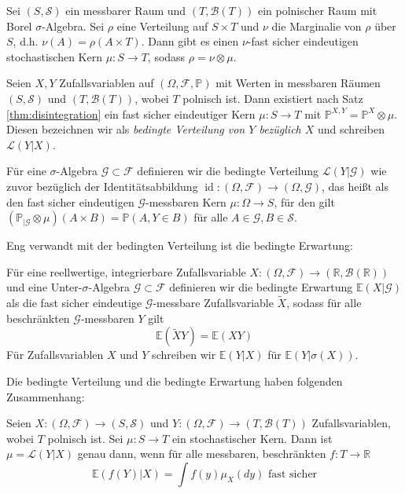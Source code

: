 \begin{theorem}\label{thm:disintegration}
Sei $(S, \mathcal{S})$ ein messbarer Raum und $(T,\mathcal{B}(T))$ ein polnischer Raum mit Borel $\sigma$-Algebra. Sei $\rho$ eine Verteilung auf $S\times T$ und $\nu$ die Marginalie von $\rho$ über $S$, d.h. $\nu(A) = \rho(A\times T)$. Dann gibt es einen $\nu$-fast sicher eindeutigen stochastischen Kern $\mu:S\rightarrow T$, sodass $\rho = \nu \otimes \mu$.
\end{theorem}
\begin{definition}
Seien $X, Y$ Zufallsvariablen auf $(\Omega, \mathcal{F}, \mathbb{P})$ mit Werten in messbaren Räumen $(S, \mathcal{S})$ und $(T, \mathcal{B}(T))$, wobei $T$ polnisch ist. Dann existiert nach Satz \ref{thm:disintegration} ein fast sicher eindeutiger Kern $\mu: S\rightarrow T$ mit $\mathbb{P}^{X, Y}=\mathbb{P}^X\otimes \mu$. Diesen bezeichnen wir als \emph{bedingte Verteilung von $Y$ bezüglich $X$} und schreiben $\mathcal{L}(Y \vert X)$.

Für eine $\sigma$-Algebra $\mathcal{G} \subset \mathcal{F}$ definieren wir die bedingte Verteilung $\mathcal{L}(Y\vert \mathcal{G})$ wie zuvor bezüglich der Identitätsabbildung $\operatorname{id}:(\Omega, \mathcal{F}) \rightarrow (\Omega, \mathcal{G})$, das heißt als den fast sicher eindeutigen $\mathcal{G}$-messbaren Kern $\mu:\Omega\rightarrow S$, für den gilt $\left(\mathbb{P}_{\vert \mathcal{G}} \otimes \mu\right)(A\times B)=\mathbb{P}(A, Y\in B)$ für alle $A \in \mathcal{G}, B\in \mathcal{S}$.
\end{definition}
Eng verwandt mit der bedingten Verteilung ist die bedingte Erwartung:
\begin{definition}
Für eine reellwertige, integrierbare Zufallsvariable $X: (\Omega, \mathcal{F}) \rightarrow (\mathbb{R}, \mathcal{B}(\mathbb{R}))$ und eine Unter-$\sigma$-Algebra $\mathcal{G}\subset \mathcal{F}$ definieren wir die bedingte Erwartung $\mathbb{E}(X\vert \mathcal{G})$ als die fast sicher eindeutige $\mathcal{G}$-messbare Zufallsvariable $\tilde{X}$, sodass für alle beschränkten $\mathcal{G}$-messbaren $Y$ gilt
$$\mathbb{E}(\tilde{X}Y) = \mathbb{E}(XY)$$
Für Zufallsvariablen $X$ und $Y$ schreiben wir $\mathbb{E}(Y\vert X)$ für $\mathbb{E}(Y \vert \sigma(X))$.
\end{definition}
Die bedingte Verteilung und die bedingte Erwartung haben folgenden Zusammenhang:
\begin{lemma}\label{thm:law_expectancy_connection}
Seien $X: (\Omega, \mathcal{F})\rightarrow (S, \mathcal{S})$ und $Y: (\Omega, \mathcal{F})\rightarrow(T, \mathcal{B}(T))$ Zufallsvariablen, wobei $T$ polnisch ist. Sei $\mu: S\rightarrow T$ ein stochastischer Kern. Dann ist $\mu = \mathcal{L}(Y\vert X)$ genau dann, wenn für alle messbaren, beschränkten $f: T\rightarrow \mathbb{R}$
$$\mathbb{E}(f(Y) \vert X) = \int f(y)\mu_X(dy) \text{ fast sicher}$$
\end{lemma}
